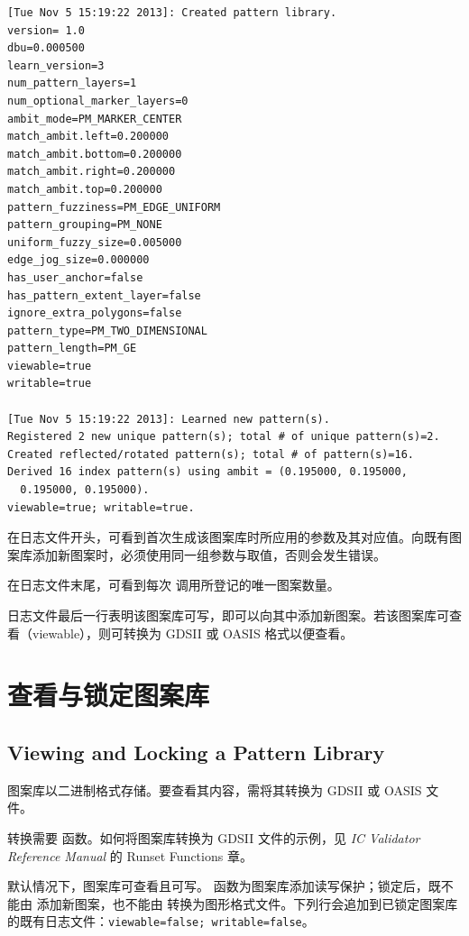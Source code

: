 \begin{lstlisting}[style=shell,caption={日志文件},label={ex:pm-lib-log}]
[Tue Nov 5 15:19:22 2013]: Created pattern library.
version= 1.0
dbu=0.000500
learn_version=3
num_pattern_layers=1
num_optional_marker_layers=0
ambit_mode=PM_MARKER_CENTER
match_ambit.left=0.200000
match_ambit.bottom=0.200000
match_ambit.right=0.200000
match_ambit.top=0.200000
pattern_fuzziness=PM_EDGE_UNIFORM
pattern_grouping=PM_NONE
uniform_fuzzy_size=0.005000
edge_jog_size=0.000000
has_user_anchor=false
has_pattern_extent_layer=false
ignore_extra_polygons=false
pattern_type=PM_TWO_DIMENSIONAL
pattern_length=PM_GE
viewable=true
writable=true

[Tue Nov 5 15:19:22 2013]: Learned new pattern(s).
Registered 2 new unique pattern(s); total # of unique pattern(s)=2.
Created reflected/rotated pattern(s); total # of pattern(s)=16.
Derived 16 index pattern(s) using ambit = (0.195000, 0.195000,
  0.195000, 0.195000).
viewable=true; writable=true.
\end{lstlisting}

在日志文件开头，可看到首次生成该图案库时所应用的参数及其对应值。向既有图案库添加新图案时，必须使用同一组参数与取值，否则会发生错误。

在日志文件末尾，可看到每次  调用所登记的唯一图案数量。

日志文件最后一行表明该图案库可写，即可以向其中添加新图案。若该图案库可查看（viewable），则可转换为 GDSII 或 OASIS 格式以便查看。

\section{查看与锁定图案库}
\subsection*{Viewing and Locking a Pattern Library}

图案库以二进制格式存储。要查看其内容，需将其转换为 GDSII 或 OASIS 文件。

转换需要  函数。如何将图案库转换为 GDSII 文件的示例，见 \textit{IC Validator Reference Manual} 的 Runset Functions 章。

默认情况下，图案库可查看且可写。 函数为图案库添加读写保护；锁定后，既不能由  添加新图案，也不能由  转换为图形格式文件。下列行会追加到已锁定图案库的既有日志文件：\texttt{viewable=false; writable=false}。

